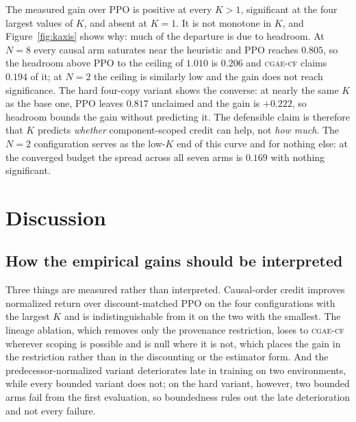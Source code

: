 \documentclass[review,authoryear,3p,times]{elsarticle}
\newcommand{\cflow}{\textsc{cgae-cf}}          %
\begin{document}
The measured gain over PPO is positive at every $K>1$, significant at the four
largest values of $K$, and absent at $K=1$. It is not monotone in $K$, and
Figure~\ref{fig:kaxis} shows why: much of the departure is due to headroom.
At $N{=}8$ every causal arm saturates near the heuristic and PPO reaches
$0.805$, so the headroom above PPO to the ceiling of $1.010$ is $0.206$ and
\cflow{} claims $0.194$ of it; at $N{=}2$ the ceiling is similarly low and the
gain does not reach significance. The hard four-copy variant shows the
converse: at nearly the same $K$ as the base one, PPO leaves $0.817$ unclaimed
and the gain is $+0.222$, so headroom bounds the gain without predicting it.
The defensible claim is therefore that $K$ predicts \emph{whether}
component-scoped credit can help, not \emph{how much}. The $N{=}2$
configuration serves as the low-$K$ end of this curve and for nothing else: at
the converged budget the spread across all seven arms is $0.169$ with nothing
significant.

\section{Discussion}
\label{sec:discussion}

\subsection{How the empirical gains should be interpreted}
\label{sec:mechanism}

Three things are measured rather than interpreted. Causal-order credit
improves normalized return over discount-matched PPO on the four
configurations with the largest $K$ and is indistinguishable from it on the
two with the smallest. The lineage ablation, which removes only the provenance
restriction, loses to \cflow{} wherever scoping is possible and is null where
it is not, which places the gain in the restriction rather than in the
discounting or the estimator form. And the predecessor-normalized variant
deteriorates late in training on two environments, while every bounded variant
does not; on the hard variant, however, two bounded arms fail from the first
evaluation, so boundedness rules out the late deterioration and not every
failure.
\end{document}
